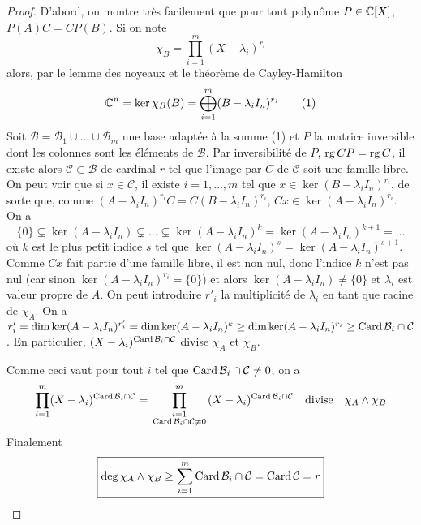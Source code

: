 \documentclass[10pt]{scrartcl}
\begin{document}
    \begin{proof}
        D'abord, on montre très facilement que pour tout polynôme $P\in\operatorname{\mathbb C}[X]$, $P(A)C=CP(B)$. 
        Si on note 
        \[
            \chi_B=\prod_{i=1}^m(X-\lambda_i)^{r_i}
        \]
        alors, par le lemme des noyeaux et le théorème de Cayley-Hamilton
        \[
            \operatorname{\mathbb C}^n=\operatorname{ker}\chi_B(B)=\bigoplus_{i=1}^m(B-\lambda_iI_n)^{r_i}\tag*{(1)}
        \]
        Soit $\mathcal B=\mathcal B_1\cup\dots\cup\mathcal B_m$ une base adaptée à la somme (1)
        et $P$ la matrice inversible dont les colonnes sont les éléments de $\mathcal B$. 
        Par inversibilité de $P$, $\operatorname{rg} CP=\operatorname{rg} C$, il existe alors $\mathcal C\subset\mathcal B$ de cardinal $r$ tel que 
        l'image par $C$ de $\mathcal C$ soit une famille libre. 
        On peut voir que si $x\in\mathcal C$, il existe $i=1,\dots,m$ tel que $x\in \ker(B-\lambda_iI_n)^{r_i}$, de sorte que,
        comme $(A-\lambda_iI_n)^{r_i}C=C(B-\lambda_iI_n)^{r_i}$, $Cx\in\ker(A-\lambda_iI_n)^{r_i}$. 
        On a 
        \[
            \lbrace 0\rbrace\subsetneq \ker(A-\lambda_iI_n)\subsetneq\dots\subsetneq \ker(A-\lambda_iI_n)^k = \ker(A-\lambda_iI_n)^{k+1} =\dots
        \]
        où $k$ est le plus petit indice $s$ tel que $\ker(A-\lambda_i I_n)^s=\ker(A-\lambda_i I_n)^{s+1}$.
        Comme $Cx$ fait partie d'une famille libre, il est non nul, donc l'indice $k$ n'est pas nul (car sinon $\ker(A-\lambda_iI_n)^{r_i}=\lbrace 0\rbrace$)
        et alors $\ker(A-\lambda_i I_n)\neq\lbrace 0\rbrace$ et $\lambda_i$ est valeur propre de $A$. 
        On peut introduire $r'_i$ la multiplicité de $\lambda_i$ en tant que racine de $\chi_A$.
        On a 
        $r_i'=\dim\operatorname{ker}(A-\lambda_i I_n)^{r_i'}=\dim\operatorname{ker}(A-\lambda_i I_n)^k\geq\dim\operatorname{ker}(A-\lambda_i I_n)^{r_i}\geq\operatorname{Card} \mathcal B_i\cap\mathcal C$.
        En particulier, $(X-\lambda_i)^{\operatorname{Card}\mathcal B_i\cap\mathcal C}$ divise $\chi_A$ et $\chi_B$.

        Comme ceci vaut pour tout $i$ tel que $\operatorname{Card}\mathcal B_i\cap\mathcal C\neq 0$, on a 
        \[
            \prod_{i=1}^m(X-\lambda_i)^{\operatorname{Card}\mathcal B_i\cap\mathcal C}=\prod_{\begin{smallmatrix} i=1\\ \operatorname{Card}\mathcal B_i\cap\mathcal C\neq 0 \end{smallmatrix}}^m (X-\lambda_i)^{\operatorname{Card}\mathcal B_i\cap\mathcal C}\quad\text{divise}\quad \chi_A\wedge\chi_B
        \]
        Finalement
        \[
            \boxed{\deg \chi_A\wedge\chi_B\geq\sum_{i=1}^m\operatorname{Card}\mathcal B_i\cap\mathcal C=\operatorname{Card}\mathcal C = r}
        \]
    \end{proof}
\end{document}
